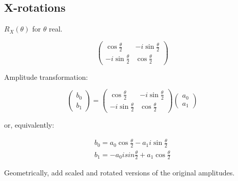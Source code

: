 \documentclass[11pt, letterpaper]{article}
\begin{document}
{\subsection{X-rotations}
$R_X(\theta)$ for $\theta$ real.

\begin{equation}
	\begin{pmatrix} \cos\frac{\theta}{2} & -i\sin\frac{\theta}{2}\\  -i\sin\frac{\theta}{2} &  \cos\frac{\theta}{2} \end{pmatrix}
\end{equation}

Amplitude transformation:

\begin{equation}
	\begin{pmatrix}b_0 \\ b_1 \end{pmatrix} =
	\begin{pmatrix} \cos\frac{\theta}{2} & -i\sin\frac{\theta}{2}\\  -i\sin\frac{\theta}{2} &  \cos\frac{\theta}{2} \end{pmatrix}
	\begin{pmatrix} a_0 \\ a_1 \end{pmatrix}
\end{equation}

or, equivalently:

\begin{eqnarray*}
	b_0 = a_0\cos\frac{\theta}{2} - a_1i\sin\frac{\theta}{2} \\
	b_1 = -a_0isin\frac{\theta}{2} + a_1\cos\frac{\theta}{2}
\end{eqnarray*}


Geometrically, add scaled and rotated versions of the original amplitudes.

}
\end{document}
